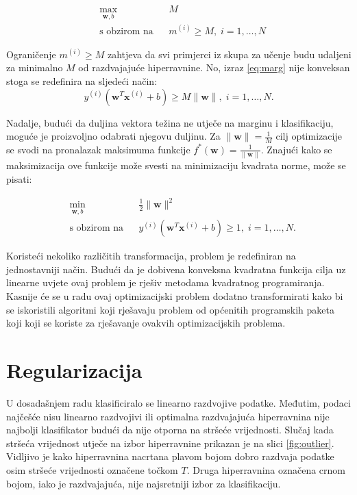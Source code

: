 \documentclass[times, utf8, zavrsni, numeric]{fer}
\begin{document}
\begin{equation}
\begin{aligned}
& \underset{\mathbf{w}, b}{\text{max}}
& & M \\
& \text{s obzirom na}
& & m^{(i)} \geq M, \; i = 1, \ldots, N
\end{aligned}
\end{equation}

\par Ograničenje $m^{(i)} \geq M$ zahtjeva da svi primjerci iz skupa za učenje budu udaljeni za minimalno $M$
od razdvajajuće hiperravnine. 
No, izraz \ref{eq:marg} nije konveksan stoga se redefinira na sljedeći način:
\begin{equation*}
  y^{(i)}(\mathbf{w}^T\mathbf{x}^{(i)} + b) \geq M\|\mathbf{w}\|, \; i = 1, \ldots, N.
\end{equation*}

Nadalje, budući da duljina vektora težina ne utječe na marginu i klasifikaciju, moguće je proizvoljno odabrati
njegovu duljinu.
Za $\|\mathbf{w}\|=\frac{1}{M}$ cilj optimizacije se svodi na pronalazak maksimuma funkcije 
$f^*(\mathbf{w}) = \frac{1}{\|\mathbf{w}\|}$. Znajući kako se maksimizacija ove funkcije može svesti na 
minimizaciju kvadrata norme, može se pisati:

\begin{equation}
\begin{aligned}
& \underset{\mathbf{w}, b}{\text{min}}
& & \frac{1}{2}\|\mathbf{w}\|^2 \\
& \text{s obzirom na}
& & y^{(i)}(\mathbf{w}^T\mathbf{x}^{(i)} + b) \geq 1, \; i = 1, \ldots, N.
\end{aligned}
\end{equation}

\par Koristeći nekoliko različitih transformacija, problem je redefiniran na jednostavniji način.
Budući da je dobivena konveksna kvadratna funkcija cilja uz linearne uvjete ovaj problem je rješiv
metodama kvadratnog programiranja. Kasnije će se u radu ovaj optimizacijski problem dodatno transformirati
kako bi se iskoristili algoritmi koji rješavaju problem  od općenitih programskih paketa koji
koji se koriste za rješavanje ovakvih optimizacijskih problema. 

\section{Regularizacija} \label{reg}
U dosadašnjem radu klasificiralo se linearno razdvojive podatke. 
Međutim, podaci najčešće nisu linearno razdvojivi ili optimalna razdvajajuća hiperravnina nije najbolji
klasifikator budući da nije otporna na stršeće vrijednosti.
Slučaj kada stršeća vrijednost utječe na izbor hiperravnine prikazan je na slici \ref{fig:outlier}.
Vidljivo je kako hiperravnina nacrtana plavom bojom dobro razdvaja podatke osim stršeće vrijednosti 
označene točkom $T$. Druga hiperravnina označena crnom bojom, iako je razdvajajuća, nije 
najsretniji izbor za klasifikaciju.
\end{document}
